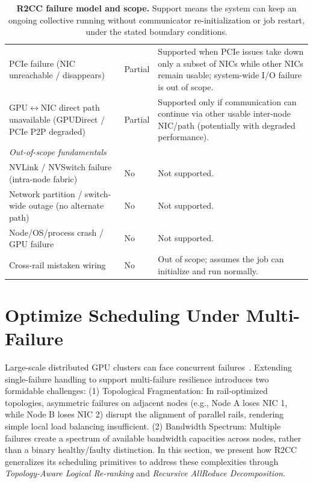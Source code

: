 \begin{table}[!t]
\begin{tabular}{p{}p{}p{}}
PCIe failure (NIC unreachable / disappears) & Partial &
Supported when PCIe issues take down only a subset of NICs while other NICs remain usable; system-wide I/O failure is out of scope. \\
\addlinespace

GPU$\leftrightarrow$NIC direct path unavailable (GPUDirect / PCIe P2P degraded) & Partial &
Supported only if communication can continue via other usable inter-node NIC/path (potentially with degraded performance). \\

\midrule
\multicolumn{3}{l}{\textit{Out-of-scope fundamentals}} \\
\midrule

NVLink / NVSwitch failure (intra-node fabric) & No &
Not supported. \\
\addlinespace

Network partition / switch-wide outage (no alternate path) & No &
Not supported. \\
\addlinespace

Node/OS/process crash / GPU failure & No &
Not supported. \\
\addlinespace

Cross-rail mistaken wiring & No &
Out of scope; assumes the job can initialize and run normally. \\
\bottomrule
\end{tabular}
\caption{\textbf{R2CC failure model and scope.} Support means the system can keep an ongoing collective running without communicator re-initialization or job restart, under the stated boundary conditions.}
\label{tab:r2cc-failure-scope}
\end{table}

\section{Optimize Scheduling Under Multi-Failure}
\label{sec:multi-failure}
Large-scale distributed GPU clusters can face concurrent failures~\cite{Revisiting_Reliability}.
Extending single-failure handling to support multi-failure resilience introduces two formidable challenges:
(1) Topological Fragmentation: In rail-optimized topologies, asymmetric failures on adjacent nodes (e.g., Node A loses NIC 1, while Node B loses NIC 2) disrupt the alignment of parallel rails, rendering simple local load balancing insufficient.
(2) Bandwidth Spectrum: Multiple failures create a spectrum of available bandwidth capacities across nodes, rather than a binary healthy/faulty distinction.
In this section, we present how R2CC generalizes its scheduling primitives to address these complexities through \textit{Topology-Aware Logical Re-ranking} and \textit{Recursive AllReduce Decomposition}.

